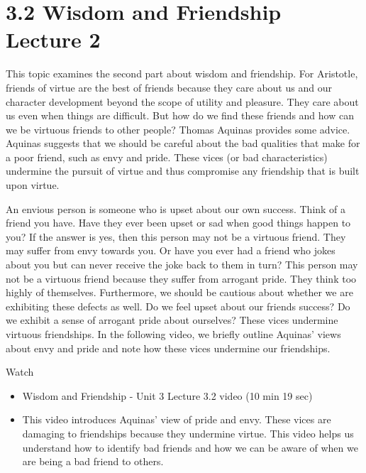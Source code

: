 \documentclass[
]{book}
\providecommand{\tightlist}{%
  \setlength{\itemsep}{0pt}\setlength{\parskip}{0pt}}
\begin{document}
\hypertarget{wisdom-and-friendship-lecture-2}{%
\section*{3.2 Wisdom and Friendship Lecture 2}\label{wisdom-and-friendship-lecture-2}}

This topic examines the second part about wisdom and friendship. For Aristotle, friends of virtue are the best of friends because they care about us and our character development beyond the scope of utility and pleasure. They care about us even when things are difficult. But how do we find these friends and how can we be virtuous friends to other people? Thomas Aquinas provides some advice. Aquinas suggests that we should be careful about the bad qualities that make for a poor friend, such as envy and pride. These vices (or bad characteristics) undermine the pursuit of virtue and thus compromise any friendship that is built upon virtue.

An envious person is someone who is upset about our own success. Think of a friend you have. Have they ever been upset or sad when good things happen to you? If the answer is yes, then this person may not be a virtuous friend. They may suffer from envy towards you. Or have you ever had a friend who jokes about you but can never receive the joke back to them in turn? This person may not be a virtuous friend because they suffer from arrogant pride. They think too highly of themselves. Furthermore, we should be cautious about whether we are exhibiting these defects as well. Do we feel upset about our friends success? Do we exhibit a sense of arrogant pride about ourselves? These vices undermine virtuous friendships. In the following video, we briefly outline Aquinas' views about envy and pride and note how these vices undermine our friendships.

Watch

\begin{itemize}
\tightlist
\item
  Wisdom and Friendship - Unit 3 Lecture 3.2 video (10 min 19 sec)
\item
  This video introduces Aquinas' view of pride and envy. These vices are damaging to friendships because they undermine virtue. This video helps us understand how to identify bad friends and how we can be aware of when we are being a bad friend to others.
\end{itemize}
\end{document}
